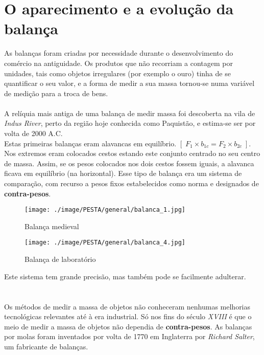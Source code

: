 \section{O aparecimento e a evolução da balança}
As balanças foram criadas por necessidade durante o desenvolvimento do comércio na antiguidade. Os produtos que não recorriam a contagem por unidades, tais como objetos irregulares (por exemplo o ouro) tinha de se quantificar o seu valor, e a forma de medir a sua massa tornou-se numa variável de medição para a troca de bens.
\\
\\
A relíquia mais antiga de uma balança de medir massa foi descoberta na vila de \textit{Indus River}, perto da região hoje conhecida como Paquistão, e estima-se ser por volta de 2000 A.C.
\\
Estas primeiras balanças eram alavancas em equilíbrio. $[ \; F_{1} \times b_{1c} = F_{2} \times b_{2c} \; ]$. Nos extremos eram colocados cestos estando este conjunto centrado no seu centro de massa. Assim, se os pesos colocados nos dois cestos fossem iguais, a alavanca ficava em equilíbrio (na horizontal). Esse tipo de balança era um sistema de comparação, com recurso a pesos fixos estabelecidos como norma e designados de \textbf{contra-pesos}.
\\
\begin{minipage}[!b]{0.45\linewidth}
	\begin{figure}[H]
		\centering
		\texttt{[image: ./image/PESTA/general/balanca\_1.jpg]}
		\caption{Balança medieval}
		\label{balanca_1}
	\end{figure}
\end{minipage}
\hspace{2.2cm}
\begin{minipage}[!b]{0.45\linewidth}
	\begin{figure}[H]
		\centering
		\texttt{[image: ./image/PESTA/general/balanca\_4.jpg]}
		\caption{Balança de laboratório}
		\label{balanca_4}
	\end{figure}
\end{minipage}
\newline
\newline
\newline
Este sistema tem grande precisão, mas também pode se facilmente adulterar.
\\
\\
\\
Os métodos de medir a massa de objetos não conheceram nenhumas melhorias tecnológicas relevantes até à era industrial. Só nos fins do século \textit{XVIII} é que o meio de medir a massa de objetos não dependia de \textbf{contra-pesos}. As balanças por molas foram inventados por volta de 1770 em Inglaterra por \textit{Richard Salter}, um fabricante de balanças.
